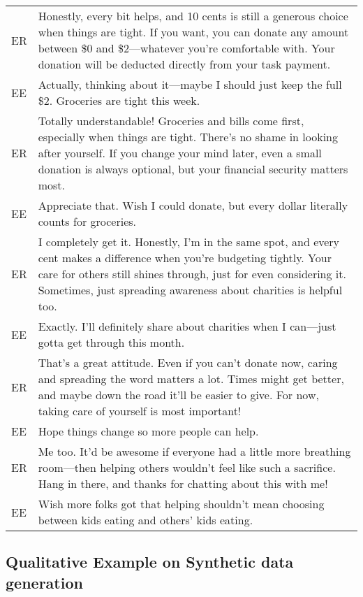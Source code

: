 \begin{table}[!htbp]
\begin{tabular}{p{} p{}}
\centering ER & Honestly, every bit helps, and 10 cents is still a generous choice when things are tight. If you want, you can donate any amount between \$0 and \$2—whatever you're comfortable with. Your donation will be deducted directly from your task payment. \\
\rowcolor{gray!15} \centering EE & Actually, thinking about it—maybe I should just keep the full \$2. Groceries are tight this week.\\
\centering ER & Totally understandable! Groceries and bills come first, especially when things are tight. There's no shame in looking after yourself. If you change your mind later, even a small donation is always optional, but your financial security matters most.\\
\rowcolor{gray!15} \centering EE & Appreciate that. Wish I could donate, but every dollar literally counts for groceries. \\
\centering ER & I completely get it. Honestly, I'm in the same spot, and every cent makes a difference when you're budgeting tightly. Your care for others still shines through, just for even considering it. Sometimes, just spreading awareness about charities is helpful too. \\
\rowcolor{gray!15} \centering EE & Exactly. I'll definitely share about charities when I can—just gotta get through this month. \\
\centering ER & That's a great attitude. Even if you can't donate now, caring and spreading the word matters a lot. Times might get better, and maybe down the road it'll be easier to give. For now, taking care of yourself is most important! \\
\rowcolor{gray!15} \centering EE & Hope things change so more people can help. \\
\centering ER & Me too. It'd be awesome if everyone had a little more breathing room—then helping others wouldn't feel like such a sacrifice. Hang in there, and thanks for chatting about this with me!\\
\rowcolor{gray!15} \centering EE & Wish more folks got that helping shouldn't mean choosing between kids eating and others' kids eating.\\
\bottomrule
\end{tabular}
\end{table}


\newpage
\subsection{Qualitative Example on Synthetic data generation}

